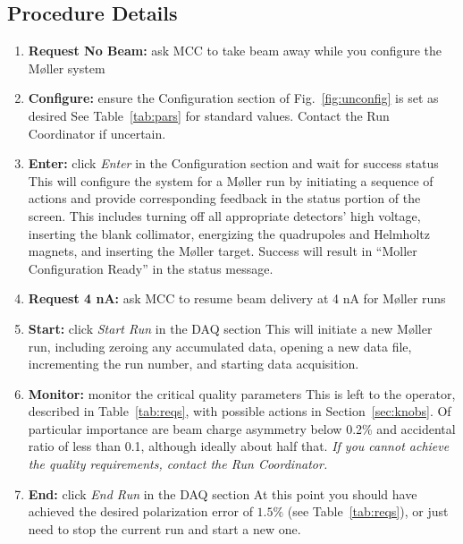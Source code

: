 \documentclass[amsmath,amssymb,notitlepage,12pt]{revtex4}
\begin{document}
\subsection{Procedure Details}
\begin{enumerate}
    \item {\bf Request No Beam:}  ask MCC to take beam away while you configure the M{\o}ller system
    \item {\bf Configure:}  ensure the Configuration section of Fig.~\ref{fig:unconfig} is set as desired
        \subitem
        See Table~\ref{tab:pars} for standard values.  Contact the Run Coordinator if uncertain.
\item {\bf Enter:} click {\em Enter} in the Configuration section and wait for success status
    \subitem This will configure the system for a M{\o}ller run by initiating a sequence of actions and provide corresponding feedback in the status portion of the screen.  This includes turning off all appropriate detectors' high voltage, inserting the blank collimator, energizing the quadrupoles and Helmholtz magnets, and inserting the M{\o}ller target.  Success will result in ``Moller Configuration Ready'' in the status message.
\item {\bf Request 4 nA:} ask MCC to resume beam delivery at 4 nA for M{\o}ller runs
\item {\bf Start:} click {\em Start Run} in the DAQ section
    \subitem This will initiate a new M{\o}ller run, including zeroing any accumulated data, opening a new data file, incrementing the run number, and starting data acquisition.
\item {\bf Monitor:} monitor the critical quality parameters
    \subitem This is left to the operator, described in Table~\ref{tab:reqs}, with possible actions in Section~\ref{sec:knobs}.  Of particular importance are beam charge asymmetry below 0.2\% and accidental ratio of less than 0.1, although ideally about half that.  {\em If you cannot achieve the quality requirements, contact the Run Coordinator.}
\item {\bf End:} click {\em End Run} in the DAQ section
    \subitem At this point you should have achieved the desired polarization error of $1.5\%$ (see Table~\ref{tab:reqs}), or just need to stop the current run and start a new one.

\end{enumerate}
\end{document}
